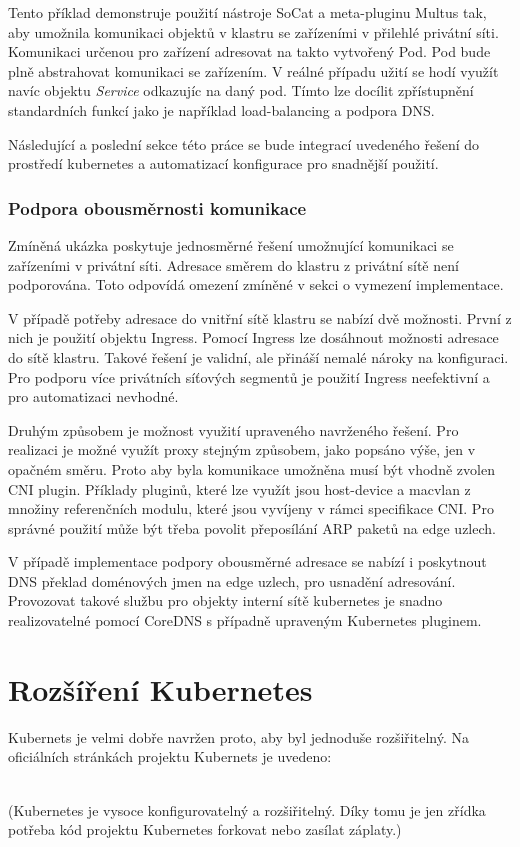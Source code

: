 \bigskip
Tento příklad demonstruje použití nástroje SoCat a meta-pluginu Multus tak, aby umožnila komunikaci objektů v klastru se zařízeními v přilehlé privátní síti. Komunikaci určenou pro zařízení adresovat na takto vytvořený Pod. Pod bude plně abstrahovat komunikaci se zařízením. V reálné případu užití se hodí využít navíc objektu \textit{Service} odkazujíc na daný pod. Tímto lze docílit zpřístupnění standardních funkcí jako je například load-balancing a podpora DNS.

Následující a poslední sekce této práce se bude integrací uvedeného řešení do prostředí kubernetes a automatizací konfigurace pro snadnější použití.  

\subsubsection*{Podpora obousměrnosti komunikace}
Zmíněná ukázka poskytuje jednosměrné řešení umožnující komunikaci se zařízeními v privátní síti. Adresace směrem do klastru z privátní sítě není podporována. Toto odpovídá omezení zmíněné v sekci o vymezení implementace.

V případě potřeby adresace do vnitřní sítě klastru se nabízí dvě možnosti. První z nich je použití objektu Ingress. Pomocí Ingress lze dosáhnout možnosti adresace do sítě klastru. Takové řešení je validní, ale přináší nemalé nároky na konfiguraci. Pro podporu více privátních síťových segmentů je použití Ingress neefektivní a pro automatizaci nevhodné.

Druhým způsobem je možnost využití upraveného navrženého řešení. Pro realizaci je možné využít proxy stejným způsobem, jako popsáno výše, jen v opačném směru. Proto aby byla komunikace umožněna musí být vhodně zvolen  CNI plugin. Příklady pluginů, které lze využít jsou host-device a macvlan z množiny referenčních modulu, které jsou vyvíjeny v rámci specifikace CNI. Pro správné použití může být třeba povolit přeposílání ARP paketů na edge uzlech.

V případě implementace podpory obousměrné adresace se nabízí i poskytnout DNS překlad doménových jmen na edge uzlech, pro usnadění adresování. Provozovat takové službu pro objekty interní sítě kubernetes je snadno realizovatelné pomocí CoreDNS s případně upraveným Kubernetes pluginem.  

\section{Rozšíření Kubernetes}\label{sec:extend}
Kubernets je velmi dobře navržen proto, aby byl jednoduše rozšiřitelný. Na oficiálních stránkách projektu Kubernets je uvedeno: 
\begin{displayquote}
\\(Kubernetes je vysoce konfigurovatelný a rozšiřitelný. Díky tomu je jen zřídka potřeba kód projektu Kubernetes forkovat nebo zasílat záplaty.) \cite{thekubernetesauthors_2022_kubernetes}
\end{displayquote}

